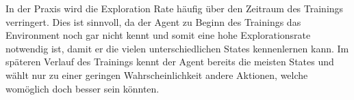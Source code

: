 \begin{itemize}
    In der Praxis wird die Exploration Rate häufig über den Zeitraum des Trainings verringert. Dies ist sinnvoll, da der Agent zu Beginn des Trainings das Environment noch gar nicht kennt und somit eine hohe Explorationsrate notwendig ist, damit er die vielen unterschiedlichen States kennenlernen kann. Im späteren Verlauf des Trainings kennt der Agent bereits die meisten States und wählt nur zu einer geringen Wahrscheinlichkeit andere Aktionen, welche womöglich doch besser sein könnten.

\end{itemize}